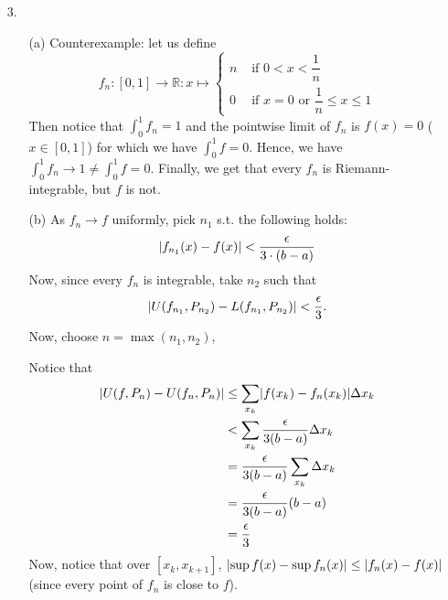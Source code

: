 \documentclass[11pt]{article}
\DeclarePairedDelimiter\abs{\lvert}{\rvert}%
\newcommand{\reals}{\mathbb{R}}
\begin{document}
\begin{itemize}
    \item[3.]
        \begin{itemize}
            \item[(a)]
                Counterexample: let us define
                \begin{equation*}
                    f_n : [0, 1] \to \reals : x \mapsto
                    \begin{cases}
                        n &\text{ if } 0 < x < \dfrac{1}{n}\\
                        0 &\text{ if $x = 0$ or $\dfrac{1}{n} \leq x \leq 1$}
                    \end{cases}
                \end{equation*}
                Then notice that $\int_0^1 f_n = 1$ and the pointwise limit of
                $f_n$ is $f(x) = 0$ ($x \in [0, 1]$) for which we have
                $\int_0^1 f = 0$. Hence, we have $\int_0^1 f_n \to 1 \neq
                \int_0^1 f = 0$. Finally, we get that every $f_n$ is
                Riemann-integrable, but $f$ is not.

            \item[(b)]
                As $f_n \to f$ uniformly, pick $n_1$ s.t. the following holds:
                \begin{equation*}
                  \abs{f_{n_1}(x) - f(x)} < \frac{\epsilon}{3\cdot(b-a)}
                \end{equation*}
                Now, since every $f_n$ is integrable, take $n_2$ such that
                \begin{equation*}
                  \abs{U(f_{n_1}, P_{n_2}) - L(f_{n_1}, P_{n_2})} <
                        \frac{\epsilon}{3}.
                \end{equation*}
                Now, choose $n = \max(n_1, n_2)$,

                Notice that 
                \begin{align*}
                    \abs{
                        U(f, P_{n}) - U(f_n, P_{n})
                    } 
                    &\leq \sum_{x_k} \abs{f(x_k) - f_n(x_k)} \Delta x_k\\
                    &< \sum_{x_k} \frac{\epsilon}{3(b-a)} \Delta x_k\\
                    &= \frac{\epsilon}{3(b-a)} \sum_{x_k} \Delta x_k\\
                    &= \frac{\epsilon}{3(b-a)} (b-a)\\
                    &= \frac{\epsilon}{3}
                \end{align*}
                Now, notice that over $[x_k, x_{k+1}]$, $\abs{\sup f(x) - \sup
                f_n(x)} \leq \abs{f_{n}(x) - f(x)}$ (since every point of $f_n$
                is close to $f$).


\end{itemize}
\end{itemize}
\end{document}
